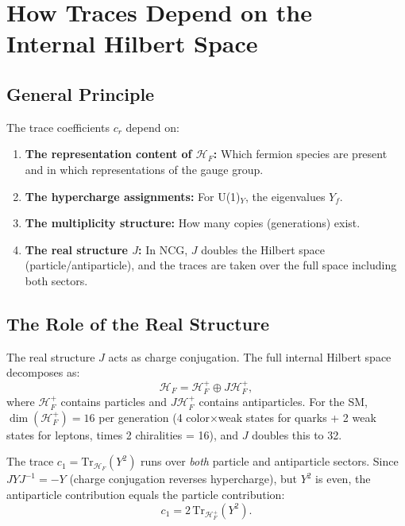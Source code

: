 \documentclass[12pt,a4paper]{article}
\begin{document}
\section{How Traces Depend on the Internal Hilbert Space}
\label{sec:trace-dependence}

\subsection{General Principle}

The trace coefficients $c_r$ depend on:
\begin{enumerate}[nosep]
\item \textbf{The representation content of $\mathcal{H}_F$:} Which fermion
  species are present and in which representations of the gauge group.
\item \textbf{The hypercharge assignments:} For U(1)$_Y$, the eigenvalues $Y_f$.
\item \textbf{The multiplicity structure:} How many copies (generations) exist.
\item \textbf{The real structure $J$:} In NCG, $J$ doubles the Hilbert space
  (particle/antiparticle), and the traces are taken over the full space
  including both sectors.
\end{enumerate}

\subsection{The Role of the Real Structure}

The real structure $J$ acts as charge conjugation.  The full internal
Hilbert space decomposes as:
\begin{equation}
\mathcal{H}_F = \mathcal{H}_F^+ \oplus J\mathcal{H}_F^+,
\end{equation}
where $\mathcal{H}_F^+$ contains particles and $J\mathcal{H}_F^+$ contains
antiparticles.  For the SM, $\dim(\mathcal{H}_F^+) = 16$ per generation
(4 color$\times$weak states for quarks + 2 weak states for leptons, times
2 chiralities = 16), and $J$ doubles this to 32.

The trace $c_1 = \mathrm{Tr}_{\mathcal{H}_F}(Y^2)$ runs over \emph{both}
particle and antiparticle sectors.  Since $J Y J^{-1} = -Y$ (charge
conjugation reverses hypercharge), but $Y^2$ is even, the antiparticle
contribution equals the particle contribution:
\begin{equation}
c_1 = 2\,\mathrm{Tr}_{\mathcal{H}_F^+}(Y^2).
\end{equation}
\end{document}
